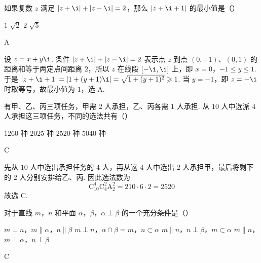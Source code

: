 \begin{problem}
如果复数 \(z\) 满足 \(|z + \i| + |z - \i| = 2\)，那么 \(|z + \i + 1|\) 的最小值是（\quad）

\choices
    {\(1\)}
    {\(\sqrt{2}\)}
    {\(2\)}
    {\(\sqrt{5}\)}
\end{problem}

\begin{answer}
A
\end{answer}

\begin{solution}
设 \(z=x+y\i\). 条件 \(|z+\i|+|z-\i|=2\) 表示点 \(z\) 到点 \((0,-1)\)、\((0,1)\) 的距离和等于两定点间距离 \(2\)，所以 \(z\) 在线段 \([-\i,\i]\) 上，即 \(x=0\)，\(-1\leqslant y\leqslant1\). 于是 \(|z+\i+1|=|1+(y+1)\i|=\sqrt{1+(y+1)^2}\geqslant1\).
当 \(y=-1\)，即 \(z=-\i\) 时取等号，故最小值为 \(1\)，选 A.
\end{solution}

\begin{problem}
有甲、乙、丙三项任务，甲需 \(2\) 人承担，乙、丙各需 \(1\) 人承担. 从 \(10\) 人中选派 \(4\) 人承担这三项任务，不同的选法共有（\quad）

\choices
    {\(1260\) 种}
    {\(2025\) 种}
    {\(2520\) 种}
    {\(5040\) 种}
\end{problem}

\begin{answer}
C
\end{answer}

\begin{solution}
先从 \(10\) 人中选出承担任务的 \(4\) 人，再从这 \(4\) 人中选出 \(2\) 人承担甲，最后将剩下的 \(2\) 人分别安排给乙、丙. 因此选法数为
\[
\mathrm C_{10}^{4}\mathrm C_{4}^{2}\mathrm A_{2}^{2}=210\cdot6\cdot2=2520
\]
故选 C.
\end{solution}

\begin{problem}
对于直线 \(m\)，\(n\) 和平面 \(\alpha\)，\(\beta\)，\(\alpha \perp \beta\) 的一个充分条件是（\quad）

\choices
    {\(m \perp n\)，\(m \parallel \alpha\)，\(n \parallel \beta\)}
    {\(m \perp n\)，\(\alpha \cap \beta = m\)，\(n \subset \alpha\)}
    {\(m \parallel n\)，\(n \perp \beta\)，\(m \subset \alpha\)}
    {\(m \parallel n\)，\(m \perp \alpha\)，\(n \perp \beta\)}
\end{problem}

\begin{answer}
C
\end{answer}

